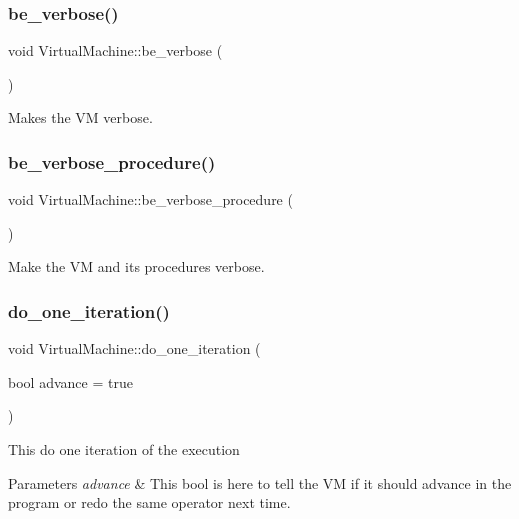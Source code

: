 \subsubsection{\texorpdfstring{be\+\_\+verbose()}{be\_verbose()}}
{\footnotesize\ttfamily void Virtual\+Machine\+::be\+\_\+verbose (\begin{DoxyParamCaption}{ }\end{DoxyParamCaption})}

Makes the VM verbose. \mbox{\label{classVirtualMachine_a7461728411b1ef5889827be0fd3f47db}} 
\subsubsection{\texorpdfstring{be\+\_\+verbose\+\_\+procedure()}{be\_verbose\_procedure()}}
{\footnotesize\ttfamily void Virtual\+Machine\+::be\+\_\+verbose\+\_\+procedure (\begin{DoxyParamCaption}{ }\end{DoxyParamCaption})}

Make the VM and its procedures verbose. \mbox{\label{classVirtualMachine_aa6de427678b13e4cb1900d33db279cbf}} 
\subsubsection{\texorpdfstring{do\+\_\+one\+\_\+iteration()}{do\_one\_iteration()}}
{\footnotesize\ttfamily void Virtual\+Machine\+::do\+\_\+one\+\_\+iteration (\begin{DoxyParamCaption}\item[{bool}]{advance = {\ttfamily true} }\end{DoxyParamCaption})}

This do one iteration of the execution 
\begin{DoxyParams}{Parameters}
{\em advance} & This bool is here to tell the VM if it should advance in the program or redo the same operator next time. \\
\hline
\end{DoxyParams}
\mbox{\label{classVirtualMachine_a5d4cc0de286c14e8f02eb00d6cc8d3e4}} 
